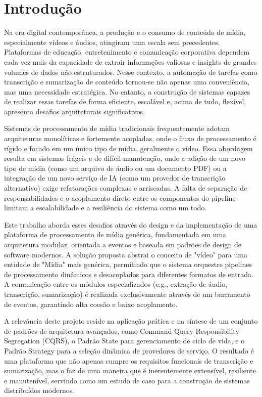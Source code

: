 \chapter{Introdução}
\label{sec:introducao}

Na era digital contemporânea, a produção e o consumo de conteúdo de mídia, especialmente vídeos e áudios, atingiram uma escala sem precedentes. Plataformas de educação, entretenimento e comunicação corporativa dependem cada vez mais da capacidade de extrair informações valiosas e insights de grandes volumes de dados não estruturados. Nesse contexto, a automação de tarefas como transcrição e sumarização de conteúdo tornou-se não apenas uma conveniência, mas uma necessidade estratégica. No entanto, a construção de sistemas capazes de realizar essas tarefas de forma eficiente, escalável e, acima de tudo, flexível, apresenta desafios arquiteturais significativos.

Sistemas de processamento de mídia tradicionais frequentemente adotam arquiteturas monolíticas e fortemente acopladas, onde o fluxo de processamento é rígido e focado em um único tipo de mídia, geralmente o vídeo. Essa abordagem resulta em sistemas frágeis e de difícil manutenção, onde a adição de um novo tipo de mídia (como um arquivo de áudio ou um documento PDF) ou a integração de um novo serviço de IA (como um provedor de transcrição alternativo) exige refatorações complexas e arriscadas. A falta de separação de responsabilidades e o acoplamento direto entre os componentes do pipeline limitam a escalabilidade e a resiliência do sistema como um todo.

Este trabalho aborda esses desafios através do design e da implementação de uma plataforma de processamento de mídia genérica, fundamentada em uma arquitetura modular, orientada a eventos e baseada em padrões de design de software modernos. A solução proposta abstrai o conceito de "vídeo" para uma entidade de "Mídia" mais genérica, permitindo que o sistema orquestre pipelines de processamento dinâmicos e desacoplados para diferentes formatos de entrada. A comunicação entre os módulos especializados (e.g., extração de áudio, transcrição, sumarização) é realizada exclusivamente através de um barramento de eventos, garantindo alta coesão e baixo acoplamento.

A relevância deste projeto reside na aplicação prática e na síntese de um conjunto de padrões de arquitetura avançados, como Command Query Responsibility Segregation (CQRS), o Padrão State para gerenciamento de ciclo de vida, e o Padrão Strategy para a seleção dinâmica de provedores de serviço. O resultado é uma plataforma que não apenas cumpre os requisitos funcionais de transcrição e sumarização, mas o faz de uma maneira que é inerentemente extensível, resiliente e manutenível, servindo como um estudo de caso para a construção de sistemas distribuídos modernos.

